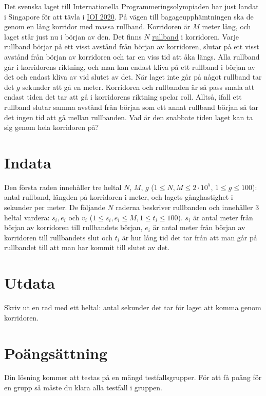 Det svenska laget till Internationella Programmeringsolympiaden har just landat i Singapore för att
tävla i \href{https://ioi2020.sg/}{IOI 2020}.
På vägen till bagageupphämtningen ska de genom en lång korridor med massa rullband.
Korridoren är $M$ meter lång, och laget står just nu i början av den.
Det finns $N$ \href{https://sv.wikipedia.org/wiki/Rullande_trottoar}{rullband} i korridoren.
Varje rullband börjar på ett visst avstånd från början av korridoren,
slutar på ett visst avstånd från början av korridoren och tar en viss tid att åka längs.
Alla rullband går i korridorens riktning, och man kan endast kliva på ett rullband i början av det och endast kliva av vid slutet av det.
När laget inte går på något rullband tar det $g$ sekunder att gå en meter.
Korridoren och rullbanden är så pass smala att endast tiden det tar att gå
i korridorens riktning spelar roll. 
Alltså, ifall ett rullband slutar samma avstånd från början
som ett annat rullband början så tar det ingen tid att gå mellan
rullbanden.
Vad är den snabbate tiden laget kan ta sig genom hela korridoren på?

\section*{Indata}
Den första raden innehåller tre heltal $N$, $M$, $g$ ($1 \le N,M \le 2 \cdot 10^5$, $1 \le g \le 100$):
antal rullband, längden på korridoren i meter, och lagets gånghastighet i sekunder per meter.
De följande $N$ raderna beskriver rullbanden och innehåller 3 heltal vardera: $s_i, e_i$ och $v_i$
($1\leq s_i,e_i\leq M,1\leq t_i\leq100$).
$s_i$ är antal meter från början av korridoren till rullbandets början, $e_i$ är antal meter
från början av korridoren till rullbandets slut och $t_i$ är hur lång tid det tar från att man går på
rullbandet till att man har kommit till slutet av det.

\section*{Utdata}
Skriv ut en rad med ett heltal: antal sekunder det tar för laget att komma genom korridoren.

\section*{Poängsättning}
Din lösning kommer att testas på en mängd testfallsgrupper.
För att få poäng för en grupp så måste du klara alla testfall i gruppen.

